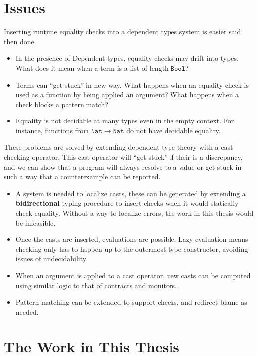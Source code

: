 \section{Issues}

Inserting runtime equality checks into a dependent types system is easier said then done.
\begin{itemize}
\item In the presence of Dependent types, equality checks may drift into types.
What does it mean when a term is a list of length $\mathtt{Bool}$?
\item Terms can ``get stuck'' in new way.
What happens when an equality check is used as a function by being applied an argument?
What happens when a check blocks a pattern match?
\item Equality is not decidable at many types even in the empty context.
For instance, functions from $\mathtt{Nat}\rightarrow\mathtt{Nat}$ do not have decidable equality.
\end{itemize}
These problems are solved by extending dependent type theory with a cast checking operator.
This cast operator will ``get stuck'' if their is a discrepancy, and we can show that a program will always resolve to a value or get stuck in such a way that a counterexample can be reported.
\begin{itemize}
\item A system is needed to localize casts, these can be generated by extending a \textbf{bidirectional} typing procedure to insert checks when it would statically check equality.
Without a way to localize errors, the work in this thesis would be infeasible.
\item Once the casts are inserted, evaluations are possible.
Lazy evaluation means checking only has to happen up to the outermost type constructor, avoiding issues of undecidability.
\item When an argument is applied to a cast operator, new casts can be computed using similar logic to that of contracts and monitors\cite{10.1145/581478.581484}.
\item Pattern matching can be extended to support checks, and redirect blame as needed. 
\end{itemize}

\section{The Work in This Thesis}

